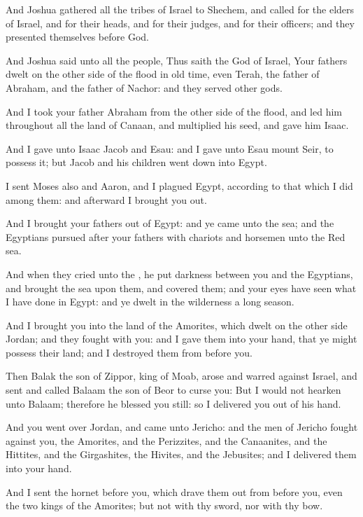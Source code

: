 \Chapter
\Verse And Joshua gathered all the tribes of Israel to Shechem, and called for the elders of Israel, and for their heads, and for their judges, and for their officers; and they presented themselves before God.

\Verse And Joshua said unto all the people, Thus saith the \LORD God of Israel, Your fathers dwelt on the other side of the flood in old time, even Terah, the father of Abraham, and the father of Nachor: and they served other gods.

\Verse And I took your father Abraham from the other side of the flood, and led him throughout all the land of Canaan, and multiplied his seed, and gave him Isaac.

\Verse And I gave unto Isaac Jacob and Esau: and I gave unto Esau mount Seir, to possess it; but Jacob and his children went down into Egypt.

\Verse I sent Moses also and Aaron, and I plagued Egypt, according to that which I did among them: and afterward I brought you out.

\Verse And I brought your fathers out of Egypt: and ye came unto the sea; and the Egyptians pursued after your fathers with chariots and horsemen unto the Red sea.

\Verse And when they cried unto the \LORD, he put darkness between you and the Egyptians, and brought the sea upon them, and covered them; and your eyes have seen what I have done in Egypt: and ye dwelt in the wilderness a long season.

\Verse And I brought you into the land of the Amorites, which dwelt on the other side Jordan; and they fought with you: and I gave them into your hand, that ye might possess their land; and I destroyed them from before you.

\Verse Then Balak the son of Zippor, king of Moab, arose and warred against Israel, and sent and called Balaam the son of Beor to curse you: \Verse But I would not hearken unto Balaam; therefore he blessed you still: so I delivered you out of his hand.

\Verse And you went over Jordan, and came unto Jericho: and the men of Jericho fought against you, the Amorites, and the Perizzites, and the Canaanites, and the Hittites, and the Girgashites, the Hivites, and the Jebusites; and I delivered them into your hand.

\Verse And I sent the hornet before you, which drave them out from before you, even the two kings of the Amorites; but not with thy sword, nor with thy bow.

